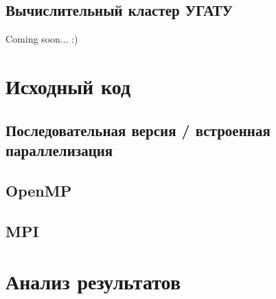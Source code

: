 \documentclass[a4paper,12pt]{article}
\begin{document}
\subsection{Вычислительный кластер УГАТУ}
Coming soon... :)

\newpage
\section{Исходный код}
\subsection{Последовательная версия / встроенная параллелизация}


\newpage
\subsection{OpenMP}


\newpage
\subsection{MPI}


\newpage
\section{Анализ результатов}
\end{document}
